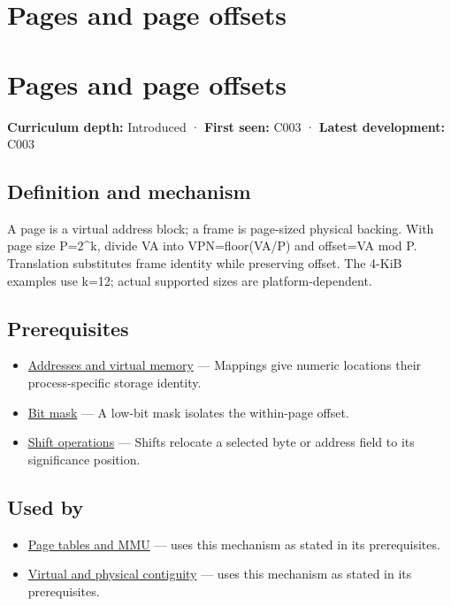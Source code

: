 \hypertarget{appendix-0c67cd5bf30a}{}
\section*{Pages and page offsets}
\section{Pages and page offsets}\label{pages-and-page-offsets}

\textbf{Curriculum depth:} Introduced · \textbf{First seen:} C003 · \textbf{Latest development:} C003

\subsection{Definition and mechanism}\label{definition-and-mechanism}

A page is a virtual address block; a frame is page-sized physical backing. With page size P=2\^{}k, divide VA into VPN=floor(VA/P) and offset=VA mod P. Translation substitutes frame identity while preserving offset. The 4-KiB examples use k=12; actual supported sizes are platform-dependent.

\subsection{Prerequisites}\label{prerequisites}

\begin{itemize}
\tightlist
\item
  \hyperref[appendix-18ee4f913c3c]{Addresses and virtual memory} --- Mappings give numeric locations their process-specific storage identity.
\item
  \hyperref[appendix-dbe5905163c2]{Bit mask} --- A low-bit mask isolates the within-page offset.
\item
  \hyperref[appendix-73425b25118e]{Shift operations} --- Shifts relocate a selected byte or address field to its significance position.
\end{itemize}

\subsection{Used by}\label{used-by}

\begin{itemize}
\tightlist
\item
  \hyperref[appendix-01e5905165c4]{Page tables and MMU} --- uses this mechanism as stated in its prerequisites.
\item
  \hyperref[appendix-f897c1ddac8f]{Virtual and physical contiguity} --- uses this mechanism as stated in its prerequisites.
\end{itemize}

